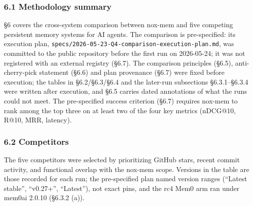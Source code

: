 \documentclass[
]{article}
\begin{document}
\subsubsection{6.1 Methodology summary}\label{methodology-summary}

§6 covers the cross-system comparison between nox-mem and five competing
persistent memory systems for AI agents. The comparison is
pre-specified: its execution plan,
\texttt{specs/2026-05-23-Q4-comparison-execution-plan.md}, was committed
to the public repository before the first run on 2026-05-24; it was not
registered with an external registry (§6.7). The comparison principles
(§6.5), anti-cherry-pick statement (§6.6) and plan provenance (§6.7)
were fixed before execution; the tables in §6.2/§6.3/§6.4 and the
later-run subsections §6.3.1--§6.3.4 were written after execution, and
§6.5 carries dated annotations of what the runs could not meet. The
pre-specified success criterion (§6.7) requires nox-mem to rank among
the top three on at least two of the four key metrics (nDCG@10, R@10,
MRR, latency).

\subsubsection{6.2 Competitors}\label{competitors}

The five competitors were selected by prioritizing GitHub stars, recent
commit activity, and functional overlap with the nox-mem scope. Versions
in the table are those recorded for each run; the pre-specified plan
named version ranges (``Latest stable'', ``v0.27+'', ``Latest''), not
exact pins, and the rc4 Mem0 arm ran under mem0ai 2.0.10 (§6.3.2 (a)).
\end{document}
